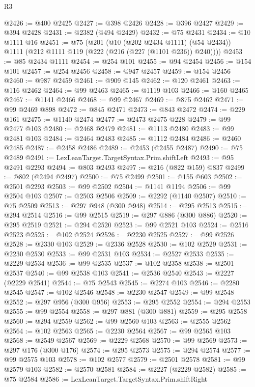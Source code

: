 \begin{lexlean}{R3}
\begin{coremodule}
@2426 := @400 @2425
@2427 := @398 @2426
@2428 := @396 @2427
@2429 := @394 @2428
@2431 := @2382 (@494 @2429)
@2432 := @75 @2431
@2434 := @10 @1111 @16
@2451 := @75
    (@201
      (@10 (@202 @2434 @1111) (@54 @2434))
      @1111
      (@212 @1111 @119 (@222 (@216 (@227 (@1101 @236)) @240))))
@2453 := @85 @2434 @1111
@2454 := @254 @101
@2455 := @94 @2454
@2456 := @154 @101
@2457 := @254 @2456
@2458 := @947 @2457
@2459 := @154 @2456
@2460 := @987 @2459
@2461 := @909 @145
@2462 := @120 @2461
@2463 := @116 @2462
@2464 := @99 @2463
@2465 := @1119 @103
@2466 := @160 @2465
@2467 := @1141 @2466
@2468 := @99 @2467
@2469 := @875 @2462
@2471 := @99 @2469 @898
@2472 := @845 @2471
@2473 := @843 @2472
@2474 := @229 @161
@2475 := @1140 @2474
@2477 := @2473 @2475 @228
@2479 := @99 @2477 @103
@2480 := @2468 @2479
@2481 := @1113 @2480
@2483 := @99 @2481 @103
@2484 := @2464 @2483
@2485 := @1112 @2484
@2486 := @2460 @2485
@2487 := @2458 @2486
@2489 := @2453 (@2455 @2487)
@2490 := @75 @2489
@2491 := LexLeanTarget.TargetSyntax.Prim.shiftLeft
@2493 := @95 @2491 @2293
@2494 := @803 @2493
@2497 := @216 (@822 @159) @837
@2499 := @802 (@2494 @2497)
@2500 := @75 @2499
@2501 := @155 @603
@2502 := @2501 @2293
@2503 := @99 @2502
@2504 := @1141 @1194
@2506 := @99 @2504 @103
@2507 := @2503 @2506
@2509 := @2292 (@1140 @2507)
@2510 := @75 @2509
@2513 := @297 @948 (@300 @948)
@2514 := @295 @2513
@2515 := @294 @2514
@2516 := @99 @2515
@2519 := @297 @886 (@300 @886)
@2520 := @295 @2519
@2521 := @294 @2520
@2523 := @99 @2521 @103
@2524 := @2516 @2523
@2525 := @102 @2524
@2526 := @2230 @2525
@2527 := @99 @2526
@2528 := @2330 @103
@2529 := @2336 @2528
@2530 := @102 @2529
@2531 := @2230 @2530
@2533 := @99 @2531 @103
@2534 := @2527 @2533
@2535 := @2229 @2534
@2536 := @99 @2535
@2537 := @102 @2358
@2538 := @2501 @2537
@2540 := @99 @2538 @103
@2541 := @2536 @2540
@2543 := @2227 (@2229 @2541)
@2544 := @75 @2543
@2545 := @2274 @103
@2546 := @2280 @2545
@2547 := @102 @2546
@2548 := @2230 @2547
@2549 := @99 @2548
@2552 := @297 @956 (@300 @956)
@2553 := @295 @2552
@2554 := @294 @2553
@2555 := @99 @2554
@2558 := @297 @881 (@300 @881)
@2559 := @295 @2558
@2560 := @294 @2559
@2562 := @99 @2560 @103
@2563 := @2555 @2562
@2564 := @102 @2563
@2565 := @2230 @2564
@2567 := @99 @2565 @103
@2568 := @2549 @2567
@2569 := @2229 @2568
@2570 := @99 @2569
@2573 := @297 @176 (@300 @176)
@2574 := @295 @2573
@2575 := @294 @2574
@2577 := @99 @2575 @103
@2578 := @102 @2577
@2579 := @2501 @2578
@2581 := @99 @2579 @103
@2582 := @2570 @2581
@2584 := @2227 (@2229 @2582)
@2585 := @75 @2584
@2586 := LexLeanTarget.TargetSyntax.Prim.shiftRight

\end{coremodule}
\end{lexlean}
